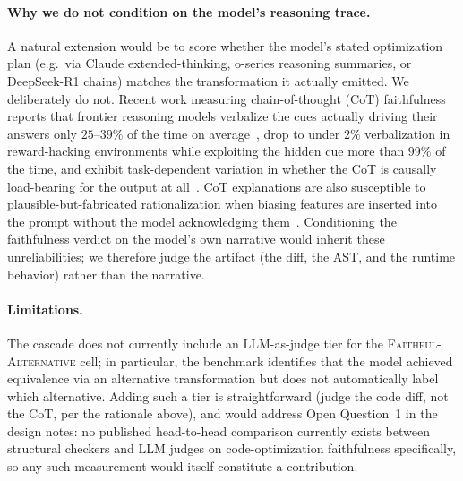 \paragraph{Why we do not condition on the model's reasoning trace.} A natural extension would be to score whether the model's stated optimization plan (e.g.\ via Claude extended-thinking, o-series reasoning summaries, or DeepSeek-R1 chains) matches the transformation it actually emitted. We deliberately do not. Recent work measuring chain-of-thought (CoT) faithfulness reports that frontier reasoning models verbalize the cues actually driving their answers only $25$--$39\%$ of the time on average~\cite{chen2025reasoningmodels}, drop to under $2\%$ verbalization in reward-hacking environments while exploiting the hidden cue more than $99\%$ of the time, and exhibit task-dependent variation in whether the CoT is causally load-bearing for the output at all~\cite{lanham2023measuring}. CoT explanations are also susceptible to plausible-but-fabricated rationalization when biasing features are inserted into the prompt without the model acknowledging them~\cite{turpin2023language}. Conditioning the faithfulness verdict on the model's own narrative would inherit these unreliabilities; we therefore judge the artifact (the diff, the AST, and the runtime behavior) rather than the narrative.

\paragraph{Limitations.} The cascade does not currently include an LLM-as-judge tier for the \textsc{Faithful-Alternative} cell; in particular, the benchmark identifies that the model achieved equivalence via an alternative transformation but does not automatically label which alternative. Adding such a tier is straightforward (judge the code diff, not the CoT, per the rationale above), and would address Open Question~1 in the design notes: no published head-to-head comparison currently exists between structural checkers and LLM judges on code-optimization faithfulness specifically, so any such measurement would itself constitute a contribution.

